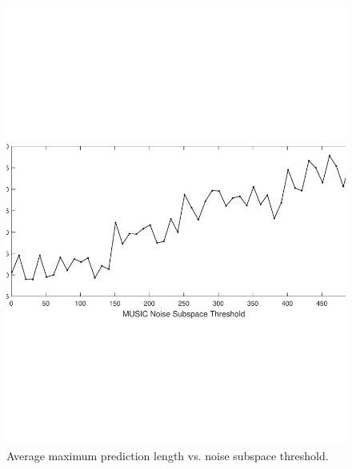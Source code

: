 \documentclass{allertonproc}
\begin{document}
\begin{figure}[ptb]
\begin{center}
\includegraphics[width=6in]{musicNoise}
\caption{Average maximum prediction length vs. noise subspace threshold. }\label{thresh}
\end{center}
\end{figure}
\end{document}

